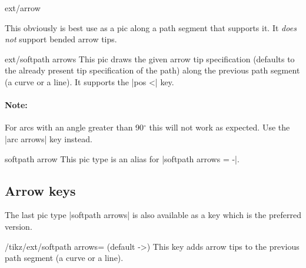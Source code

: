 \begin{multicols}{2}
\begin{pictype}{ext/arrow}{}
  
  This obviously is best use as a pic along a path segment that supports it.
  It \emph{does not} support bended arrow tips.
\begin{codeexample}[preamble=\usetikzlibrary{bending, ext.arrows-plus}]
\end{codeexample}
\end{pictype}

\begin{pictype}{ext/softpath arrows}{}
  This pic draws the given arrow tip specification
  (defaults to the already present tip specification of the path)
  along the previous path segment (a curve or a line).
  It supports the |pos <| key.
  
  \paragraph{Note:} For arcs with an angle greater than 90${}^\circ$
    this will not work as expected. Use the |arc arrows| key instead.
\end{pictype}
\begin{pictype}{softpath arrow}{}
  This pic type is an alias for |softpath arrows = -|.
\end{pictype}

\subsection{Arrow keys}
The last pic type |softpath arrows| is also available as a key
which is the preferred version.
\begin{key}{/tikz/ext/softpath arrows= (default ->)}
This key adds arrow tips to the previous path segment (a curve or a line).


\end{key}
\end{multicols}
